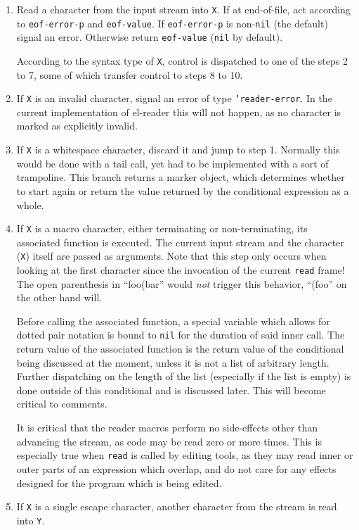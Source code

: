 \documentclass[a4paper,10pt,twoside]{report}
\newcommand{\elr}{el-reader}
\newcommand{\fun}[1]{\texttt{#1}}
\newcommand{\Read}{\fun{read}}
\begin{document}
\begin{enumerate}
\item Read a character from the input stream into \texttt{X}.  If at
  end-of-file, act according to \texttt{eof-error-p} and \texttt{eof-value}.
  If \texttt{eof-error-p} is non-\texttt{nil} (the default) signal an error.
  Otherwise return \texttt{eof-value} (\texttt{nil} by default).

  According to the syntax type of \texttt{X}, control is dispatched to one of
  the steps 2 to 7, some of which transfer control to steps 8 to 10.
\item If \texttt{X} is an invalid character, signal an error of type
  \texttt{'reader-error}.  In the current implementation of \elr{} this will not
  happen, as no character is marked as explicitly invalid.
\item If \texttt{X} is a whitespace character, discard it and jump to step 1.
  Normally this would be done with a tail call, yet had to be implemented with a
  sort of trampoline.  This branch returns a marker object, which determines
  whether to start again or return the value returned by the conditional
  expression as a whole.
\item If \texttt{X} is a macro character, either terminating or non-terminating,
  its associated function is executed.  The current input stream and the
  character (\texttt{X}) itself are passed as arguments.  Note that this step
  only occurs when looking at the first character since the invocation of the
  current \Read{} frame!  The open parenthesis in ``foo(bar'' would \emph{not}
  trigger this behavior, ``(foo'' on the other hand will.

  Before calling the associated function, a special variable which allows for
  dotted pair notation is bound to \texttt{nil} for the duration of said inner
  call.  The return value of the associated function is the return value of the
  conditional being discussed at the moment, unless it is not a list of
  arbitrary length.  Further dispatching on the length of the list (especially
  if the list is empty) is done outside of this conditional and is discussed
  later.  This will become critical to comments.

  It is critical that the reader macros perform no side-effects other than
  advancing the stream, as code may be read zero or more times.  This is
  especially true when \Read{} is called by editing tools, as they may read
  inner or outer parts of an expression which overlap, and do not care for any
  effects designed for the program which is being edited.
\item If \texttt{X} is a single escape character, another character from
  the stream is read into \texttt{Y}.


\end{enumerate}
\end{document}
